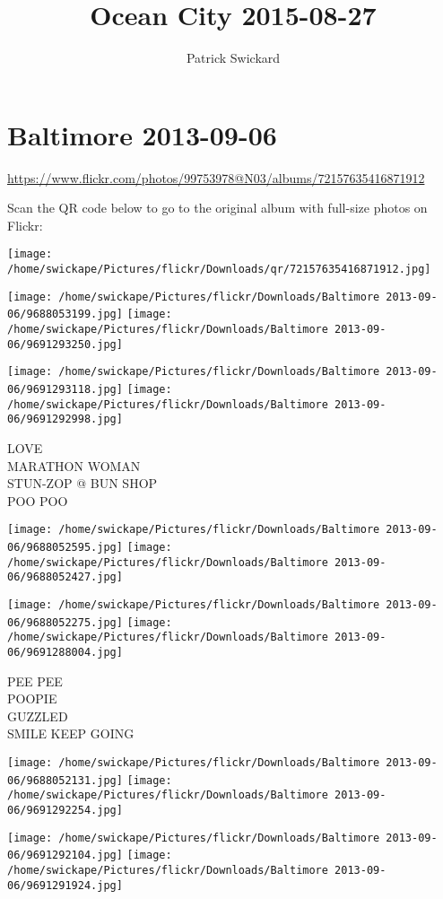 \documentclass[10pt,letterpaper]{article}
\title{Ocean City 2015-08-27}
\author{Patrick Swickard}
\date{}
\begin{document}
\section*{Baltimore 2013-09-06}

\url{https://www.flickr.com/photos/99753978@N03/albums/72157635416871912}

Scan the QR code below to go to the original album with full-size photos on Flickr:

\texttt{[image: /home/swickape/Pictures/flickr/Downloads/qr/72157635416871912.jpg]}
\pagebreak

\texttt{[image: /home/swickape/Pictures/flickr/Downloads/Baltimore 2013-09-06/9688053199.jpg]}
\texttt{[image: /home/swickape/Pictures/flickr/Downloads/Baltimore 2013-09-06/9691293250.jpg]}

\texttt{[image: /home/swickape/Pictures/flickr/Downloads/Baltimore 2013-09-06/9691293118.jpg]}
\texttt{[image: /home/swickape/Pictures/flickr/Downloads/Baltimore 2013-09-06/9691292998.jpg]}

LOVE\\
MARATHON WOMAN\\
STUN{-}ZOP @ BUN SHOP\\
POO POO
\pagebreak

\texttt{[image: /home/swickape/Pictures/flickr/Downloads/Baltimore 2013-09-06/9688052595.jpg]}
\texttt{[image: /home/swickape/Pictures/flickr/Downloads/Baltimore 2013-09-06/9688052427.jpg]}

\texttt{[image: /home/swickape/Pictures/flickr/Downloads/Baltimore 2013-09-06/9688052275.jpg]}
\texttt{[image: /home/swickape/Pictures/flickr/Downloads/Baltimore 2013-09-06/9691288004.jpg]}

PEE PEE\\
POOPIE\\
GUZZLED\\
SMILE KEEP GOING
\pagebreak

\texttt{[image: /home/swickape/Pictures/flickr/Downloads/Baltimore 2013-09-06/9688052131.jpg]}
\texttt{[image: /home/swickape/Pictures/flickr/Downloads/Baltimore 2013-09-06/9691292254.jpg]}

\texttt{[image: /home/swickape/Pictures/flickr/Downloads/Baltimore 2013-09-06/9691292104.jpg]}
\texttt{[image: /home/swickape/Pictures/flickr/Downloads/Baltimore 2013-09-06/9691291924.jpg]}
\end{document}
